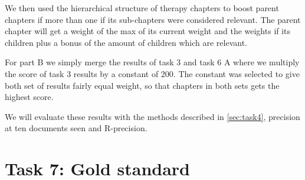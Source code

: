 We then used the hierarchical structure of therapy chapters to boost parent
chapters if more than one if its sub-chapters were considered relevant. The
parent chapter will get a weight of the max of its current weight and the
weights if its children plus a bonus of the amount of children which are
relevant.

For part B we simply merge the results of task 3 and task 6 A where we
multiply the score of task 3 results by a constant of 200. The constant was
selected to give both set of results fairly equal weight, so that chapters
in both sets gets the highest score.

We will evaluate these results with the methods described in
\autoref{sec:task4}, precision at ten documents seen and R-precision.


\section{Task 7: Gold standard}


